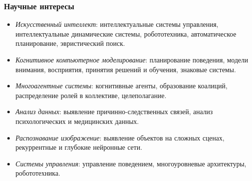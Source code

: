 \documentclass[default]{beamer}
\begin{document}
	\begin{frame}
		\frametitle{Научные интересы}
		\begin{itemize}
			\item \textit{Искусственный интеллект}: интеллектуальные системы управления, интеллектуальные динамические системы, робототехника, автоматическое планирование, эвристический поиск.
			\item \textit{Когнитивное компьютерное моделирование}: планирование поведения, модели внимания, восприятия, принятия решений и обучения, знаковые системы.
			\item \textit{Многоагентные системы}: когнитивные агенты, образование коалиций, распределение ролей в коллективе, целеполагание.
			\item \textit{Анализ данных}: выявление причинно-следственных связей, анализ психологических и медицинских данных.
			\item \textit{Распознавание изображение}: выявление объектов на сложных сценах, рекуррентные и глубокие нейронные сети.
			\item \textit{Системы управления}: управление поведением, многоуровневые архитектуры, робототехника.
		\end{itemize}
	\end{frame}
	
\end{document}
